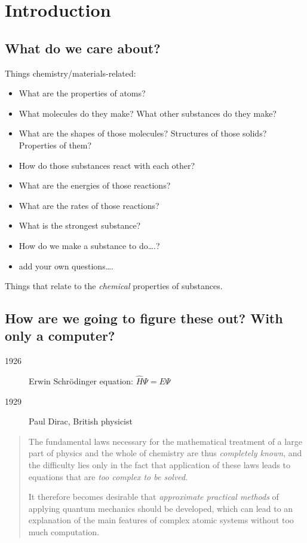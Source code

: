 \documentclass[11pt]{article}
\author{William F. Schneider}
\date{\today}
\title{}
\begin{document}
\tableofcontents

\section{Introduction}
\label{sec:org42474f4}
\subsection{What do we care about?}
\label{sec:orgaddff7f}

Things chemistry/materials-related:

\begin{itemize}
\item What are the properties of atoms?
\item What molecules do they make?  What other substances do they make?
\item What are the shapes of those molecules?  Structures of those solids?  Properties of them?
\item How do those substances react with each other?
\item What are the energies of those reactions?
\item What are the rates of those reactions?
\item What is the strongest substance?
\item How do we make a substance to do\ldots{}.?
\item add your own questions\ldots{}.
\end{itemize}

Things that relate to the \emph{chemical} properties of substances.

\subsection{How are we going to figure these out?  With only a computer?}
\label{sec:org3cbd07b}
\begin{description}
\item[{1926}] Erwin Schr\"{o}dinger equation: \(\hat{H}\Psi=E\Psi\)
\item[{1929}] Paul Dirac, British physicist
\end{description}

\begin{quote}
The fundamental laws necessary for the mathematical treatment of a
large part of physics and the whole of chemistry are thus \emph{completely
known}, and the difficulty lies only in the fact that application of
these laws leads to equations that are \emph{too complex to be solved}.

It therefore becomes desirable that \emph{approximate practical methods} of
applying quantum mechanics should be developed, which can lead to an
explanation of the main features of complex atomic systems without
too much computation.
\end{quote}
\end{document}
